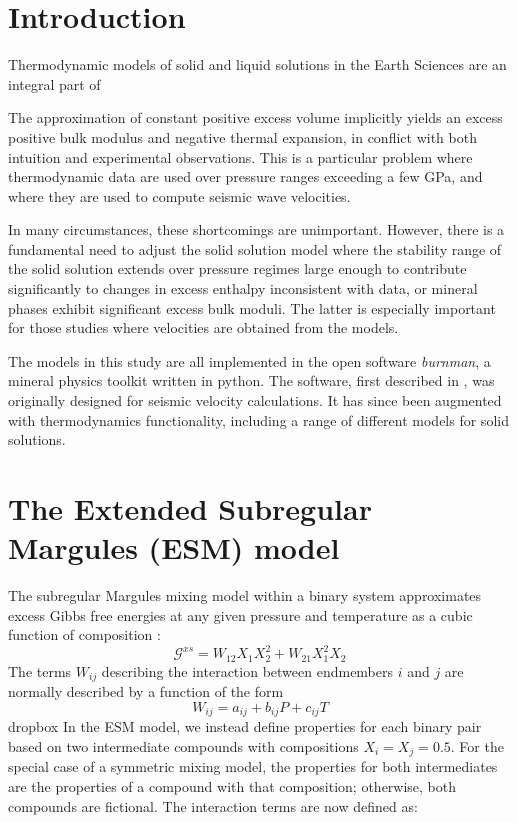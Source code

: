 \documentclass[review]{elsarticle}
\begin{document}
\linenumbers

\section{Introduction}

Thermodynamic models of solid and liquid solutions in the Earth Sciences are an integral part of 


  The approximation of constant positive excess volume implicitly yields an excess positive bulk modulus and negative thermal expansion, in conflict with both intuition and experimental observations. This is a particular problem where thermodynamic data are used over pressure ranges exceeding a few GPa, and where they are used to compute seismic wave velocities. 

In many circumstances, these shortcomings are unimportant. However, there is a fundamental need to adjust the solid solution model where the stability range of the solid solution extends over pressure regimes large enough to contribute significantly to changes in excess enthalpy inconsistent with data, or mineral phases exhibit significant excess bulk moduli. The latter is especially important for those studies where velocities are obtained from the models.

The models in this study are all implemented in the open software \emph{burnman}, a mineral physics toolkit written in python. The software, first described in \cite{CHRU2014}, was originally designed for seismic velocity calculations. It has since been augmented with thermodynamics functionality, including a range of different models for solid solutions.

\section{The Extended Subregular Margules (ESM) model}
The subregular Margules mixing model within a binary system approximates excess Gibbs free energies at any given pressure and temperature as a cubic function of composition \citep{HW1989}:
\begin{equation}
  \mathcal{G}^{xs} = W_{12} X_1X_2^2 + W_{21} X_1^2X_2 
\end{equation}
The terms $W_{ij}$ describing the interaction between endmembers $i$ and $j$ are normally described by a function of the form
\begin{equation}
  W_{ij} = a_{ij} + b_{ij}P + c_{ij}T
\end{equation}
dropbox
In the ESM model, we instead define properties for each binary pair based on two intermediate compounds with compositions $X_i = X_j = 0.5$. For the special case of a symmetric mixing model, the properties for both intermediates are the properties of a compound with that composition; otherwise, both compounds are fictional. The interaction terms are now defined as:
\end{document}
